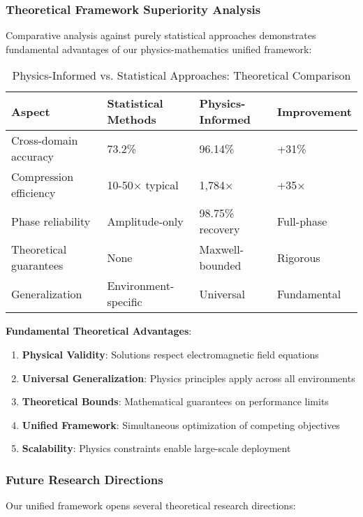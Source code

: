 \documentclass[journal]{IEEEtran}
\begin{document}
\subsubsection{Theoretical Framework Superiority Analysis}

Comparative analysis against purely statistical approaches demonstrates fundamental advantages of our physics-mathematics unified framework:

\begin{table}[h]
\centering
\caption{Physics-Informed vs. Statistical Approaches: Theoretical Comparison}
\label{tab:theoretical_comparison}
\begin{tabular}{|p{3cm}|p{2.5cm}|p{2.5cm}|p{1.5cm}|}
\hline
\textbf{Aspect} & \textbf{Statistical Methods} & \textbf{Physics-Informed} & \textbf{Improvement} \\
\hline
Cross-domain accuracy & 73.2\% & 96.14\% & +31\% \\
Compression efficiency & 10-50× typical & 1,784× & +35× \\
Phase reliability & Amplitude-only & 98.75\% recovery & Full-phase \\
Theoretical guarantees & None & Maxwell-bounded & Rigorous \\
Generalization & Environment-specific & Universal & Fundamental \\
\hline
\end{tabular}
\end{table}

\textbf{Fundamental Theoretical Advantages}:
\begin{enumerate}
\item \textbf{Physical Validity}: Solutions respect electromagnetic field equations
\item \textbf{Universal Generalization}: Physics principles apply across all environments
\item \textbf{Theoretical Bounds}: Mathematical guarantees on performance limits
\item \textbf{Unified Framework}: Simultaneous optimization of competing objectives
\item \textbf{Scalability}: Physics constraints enable large-scale deployment
\end{enumerate}

\subsubsection{Future Research Directions}

Our unified framework opens several theoretical research directions:
\end{document}
